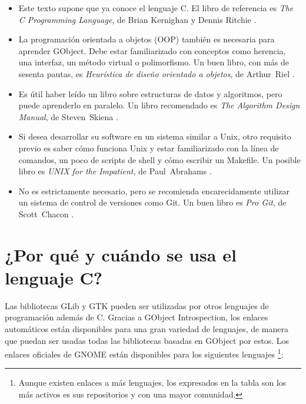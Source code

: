 \begin{itemize}
    \item Este texto supone que ya conoce el lenguaje C. El libro de referencia es \emph{The C Programming Language}, de Brian Kernighan y Dennis Ritchie \cite{k-r-book}.
    
    \item La programación orientada a objetos (OOP) también es necesaria para aprender GObject. Debe estar familiarizado con conceptos como herencia, una interfaz, un método virtual o polimorfismo. Un buen libro, con más de sesenta pautas, es \emph{Heurística de diseño orientado a objetos}, de Arthur~Riel \cite{oop-book}.
    
    \item Es útil haber leído un libro sobre estructuras de datos y algoritmos, pero puede aprenderlo en paralelo. Un libro recomendado es \emph{The Algorithm Design Manual}, de Steven~Skiena \cite{algo-book}.
    
    \item Si desea desarrollar su software en un sistema similar a Unix, otro requisito previo es saber cómo funciona Unix y estar familiarizado con la línea de comandos, un poco de scripts de shell y cómo escribir un Makefile. Un posible libro es \emph{UNIX for the Impatient}, de Paul~Abrahams \cite{unix-impatient}.
    
    \item No es estrictamente necesario, pero se recomienda encarecidamente utilizar un sistema de control de versiones como Git. Un buen libro es \emph{Pro Git}, de Scott~Chacon \cite{pro-git}.
\end{itemize}

\section{¿Por qué y cuándo se usa el lenguaje C?}

Las bibliotecas GLib y GTK pueden ser utilizadas por otros lenguajes de programación además de C. Gracias a GObject Introspection, los enlaces automáticos están disponibles para una gran variedad de lenguajes, de manera que puedan ser usadas todas las bibliotecas basadas en GObject por estos. Los enlaces oficiales de GNOME están disponibles para los siguientes lenguajes \footnote{Aunque existen enlaces a más lenguajes, los expresados en la tabla son los más activos es sus repositorios y con una mayor comunidad.}:

